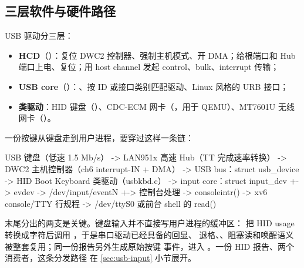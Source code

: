 \subsection{三层软件与硬件路径}

USB 驱动分三层：

\begin{itemize}
  \item \textbf{HCD}（）：复位 DWC2 控制器、强制主机模式、开 DMA；给根端口和 Hub 端口上电、复位；用 host channel 发起 control、bulk、interrupt 传输；
  \item \textbf{USB core}（）：、按 ID 或接口类别匹配驱动、Linux 风格的 URB 接口；
  \item \textbf{类驱动}：HID 键盘（）、CDC-ECM 网卡（，用于 QEMU）、MT7601U 无线网卡（）。
\end{itemize}

一份按键从键盘走到用户进程，要穿过这样一条链：

\begin{txtcode}
USB 键盘（低速 1.5 Mb/s）
  -> LAN951x 高速 Hub（TT 完成速率转换）
  -> DWC2 主机控制器（ch6 interrupt-IN + DMA）
  -> USB bus：struct usb_device
  -> HID Boot Keyboard 类驱动（usbkbd.c）
  -> input core：struct input_dev
      +-> evdev -> /dev/input/eventN
      +-> 控制台处理 -> consoleintr()
          -> xv6 console/TTY 行规程
          -> /dev/ttyS0 或前台 shell 的 read()
\end{txtcode}

末尾分出的两支是关键。键盘输入并不直接写用户进程的缓冲区：
把 HID usage 转换成字符后调用 ，于是串口驱动已经具备的回显、
退格、、阻塞读和唤醒语义被整套复用；同一份报告另外生成原始按键
事件，进入 。一份 HID 报告、两个消费者，这条分发路径
在 \ref{sec:usb-input} 小节展开。

